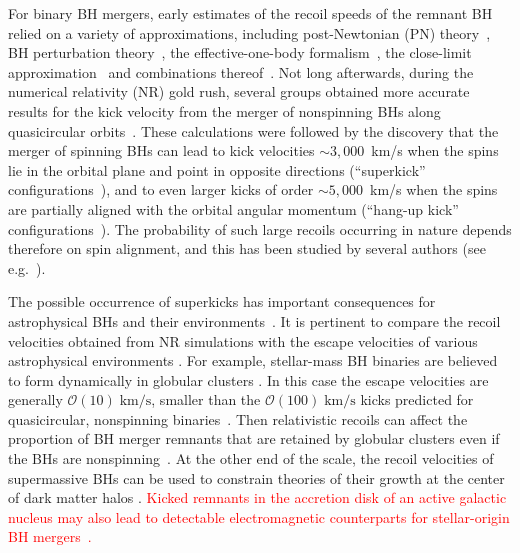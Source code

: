 \documentclass[floats,floatfix,showpacs,amssymb,prd,twocolumn,superscriptaddress,nofootinbib,nolongbibliography,reprint]{revtex4-2}
\newcounter{count}
\newcommand{\mr}[1]{{\textcolor{cyan}{\sf{[MR: #1]}} }}
\newcommand{\eb}[1]{{\textcolor{blue}{\sf{[EB: #1]}} }}
\newcommand{\new}[1]{{\textcolor{red}{ #1} }}
\begin{document}

For binary BH mergers, early estimates of the recoil speeds of the
remnant BH relied on a variety of approximations, including
post-Newtonian (PN) theory~\cite{Fitchett1983-xq,Blanchet:2005rj}, BH
perturbation theory~\cite{Hughes:2004ck}, the effective-one-body
formalism~\cite{Damour:2006tr}, the close-limit
approximation~\cite{Sopuerta:2006wj,Sopuerta:2006et} and combinations
thereof~\cite{LeTiec:2009yg}. Not long afterwards, during the
numerical relativity (NR) gold rush, several groups obtained more
accurate results for the kick velocity from the merger of nonspinning
BHs along
quasicircular
orbits~\cite{Baker:2006vn,Gonzalez:2006md,Herrmann:2007cwl}.
These calculations were followed by the discovery that the merger of
spinning BHs can lead to kick velocities $\sim 3,000$~km/s when the
spins lie in the orbital plane and point in opposite directions
(``superkick''
configurations~\cite{Gonzalez:2007hi,Campanelli:2007cga,Campanelli:2007ew}),
and to even larger kicks of order $\sim 5,000$~km/s when the spins are
partially aligned with the orbital angular momentum (``hang-up kick''
configurations~\cite{Lousto:2011kp}). 
The probability of such large
recoils occurring in nature depends therefore on spin alignment, and
this has been studied by several authors (see
e.g.~\cite{Schnittman:2007sn,Dotti:2009vz,Kesden:2010ji,Lousto:2012su,Berti:2012zp,Lousto:2012su}).

The possible occurrence of superkicks has important consequences for
astrophysical BHs and their
environments~\cite{Komossa:2012cy,Colpi:2014poa,Blecha:2015baa,Barack:2018yly}.
It is pertinent to compare the recoil velocities obtained from NR
simulations with the escape velocities of various astrophysical
environments \cite{Merritt:2004xa}. For example, stellar-mass BH
binaries are believed to form dynamically in globular clusters
\cite{Benacquista:2011kv}. In this case the escape velocities are
generally $\mathcal{O}(10)\;\mathrm{km/s}$, smaller than the
$\mathcal{O}(100)\;\mathrm{km/s}$ kicks predicted for quasicircular,
nonspinning binaries~\cite{Gonzalez:2006md}. Then relativistic recoils
can affect the proportion of BH merger remnants that are retained by
globular clusters even if the BHs are
nonspinning~\cite{Morawski:2018kfs}. At the other end of the scale,
the recoil velocities of supermassive BHs can be used to constrain
theories of their growth at the center of dark matter halos
\cite{Haiman:2004ve}. \new{Kicked remnants in the accretion disk of an
active galactic nucleus may also lead to detectable electromagnetic
counterparts for stellar-origin BH
mergers~\cite{Graham:2020gwr,Chen:2020gek}.}
\end{document}
